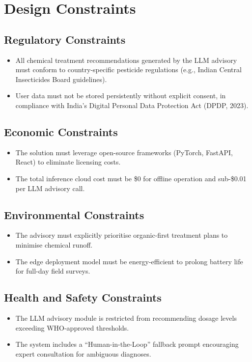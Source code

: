 \documentclass[12pt,oneside]{report}
\begin{document}
\section{Design Constraints}

\subsection{Regulatory Constraints}
\begin{itemize}
    \item All chemical treatment recommendations generated by the LLM advisory must conform to country-specific pesticide regulations (e.g., Indian Central Insecticides Board guidelines).
    \item User data must not be stored persistently without explicit consent, in compliance with India's Digital Personal Data Protection Act (DPDP, 2023).
\end{itemize}

\subsection{Economic Constraints}
\begin{itemize}
    \item The solution must leverage open-source frameworks (PyTorch, FastAPI, React) to eliminate licensing costs.
    \item The total inference cloud cost must be \$0 for offline operation and sub-\$0.01 per LLM advisory call.
\end{itemize}

\subsection{Environmental Constraints}
\begin{itemize}
    \item The advisory must explicitly prioritise organic-first treatment plans to minimise chemical runoff.
    \item The edge deployment model must be energy-efficient to prolong battery life for full-day field surveys.
\end{itemize}

\subsection{Health and Safety Constraints}
\begin{itemize}
    \item The LLM advisory module is restricted from recommending dosage levels exceeding WHO-approved thresholds.
    \item The system includes a ``Human-in-the-Loop'' fallback prompt encouraging expert consultation for ambiguous diagnoses.
\end{itemize}
\end{document}
